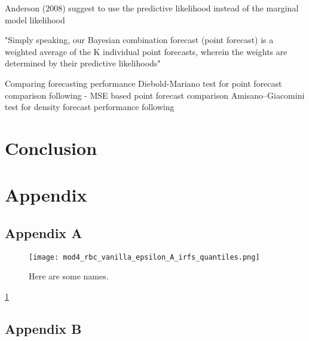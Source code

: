 \documentclass[12pt,a4paper,english]{article} %
\let\oldsection\section
\renewcommand\section{\clearpage\oldsection}
\begin{document}
	Anderson (2008) suggest to use the predictive likelihood instead of the marginal model likelihood
	
	"Simply speaking, our Bayesian combination forecast (point forecast) is a weighted average of the K individual point forecasts, wherein the weights are determined by their predictive likelihoods" \cite{chin_bayesian_2019}
	
	Comparing forecasting performance
	Diebold-Mariano test for point forecast comparison following \cite{chin_bayesian_2019}
	- MSE based point forecast comparison 
	Amisano–Giacomini test for density forecast performance following  \cite{chin_bayesian_2019}

	
	\section{Conclusion}
	
	
	
	
	\section*{Appendix}
	
	\subsection*{Appendix A}
		
	\begin{figure}[h]
		\begin{center}
			\texttt{[image: mod4\_rbc\_vanilla\_epsilon\_A\_irfs\_quantiles.png]}
			\caption{Here are some names.}\label{fig:test}
		\end{center}
	\end{figure}
	\ref{fig:test}
	
	
	\pagebreak
	\subsection*{Appendix B} \label{appb}
	
	\begin{center}
	\end{center}

	
	
\end{document}
